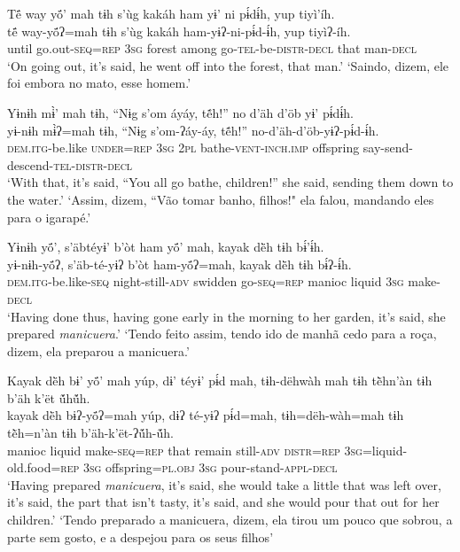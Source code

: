 \documentclass[output=paper,
modfonts,nonflat
]{langsci/langscibook}
\begin{document}
\ea  Të́ way yö́’ mah tɨh s’ùg kakáh ham yɨ’ ni pɨ́dɨ́h, yup tiyì’íh.\\ 
\gll të́ way-yö́ʔ=mah tɨh s’ùg kakáh ham-yɨʔ-ni-pɨ́d-ɨ́h, yup tiyìʔ-íh.\\
     until go.out\textsc{-seq=rep} \textsc{3sg} forest among go\textsc{-tel-}be\textsc{-distr-decl} that man\textsc{-decl}\\
\glt ‘On going out, it’s said, he went off into the forest, that man.'
\glt ‘Saindo, dizem, ele foi embora no mato, esse homem.'
\z 

\ea  Yɨnɨh mɨ̀’ mah tɨh, “Nɨg s’om áyáy, tẽ́h!” no d’äh d’öb yɨ’ pɨ́dɨ́h.\\ 
\gll yɨ-nɨh mɨ̀ʔ=mah tɨh, “Nɨg s’om-ʔáy-áy, tẽ́h!” no-d’äh-d’öb-yɨʔ-pɨ́d-ɨ́h.\\
     \textsc{dem.itg-}be.like \textsc{under=rep} \textsc{3sg} \textsc{2pl} bathe\textsc{-vent-inch.imp} offspring say-send-descend\textsc{-tel-distr-decl}\\
\glt ‘With that, it’s said, “You all go bathe, children!” she said, sending them down to the water.'
\glt ‘Assim, dizem, “Vão tomar banho, filhos!" ela falou, mandando eles para o igarapé.'
\z 

\ea  Yɨnɨh yö́’, s’äbtéyɨ’ b’òt ham yö́’ mah, kayak dë̀h tɨh bɨ́’ɨ́h.\\ 
\gll yɨ-nɨh-yö́ʔ, s’äb-té-yɨʔ b’òt ham-yö́ʔ=mah, kayak dë̀h tɨh bɨ́ʔ-ɨ́h.\\
     \textsc{dem.itg-}be.like\textsc{-seq} night-still\textsc{-adv} swidden go\textsc{-seq=rep} manioc liquid \textsc{3sg} make\textsc{-decl}\\
\glt ‘Having done thus, having gone early in the morning to her garden, it’s said, she prepared \textit{manicuera}.'
\glt ‘Tendo feito assim, tendo ido de manhã cedo para a roça, dizem, ela preparou a manicuera.'
\z 

\ea  Kayak dë̀h bɨ’ yö́’ mah yúp, dɨ’ téyɨ’ pɨ́d mah, tɨh-dëhwàh mah tɨh tẽ̀hn’àn tɨh b’äh k’ët ṹhṹh.\\ 
\gll kayak dë̀h bɨʔ-yö́ʔ=mah yúp, dɨʔ té-yɨʔ pɨ́d=mah, tɨh=dëh-wàh=mah tɨh tẽ̀h=n’àn tɨh b’äh-k’ët-ʔṹh-ṹh.\\
     manioc liquid make\textsc{-seq=rep} that remain still\textsc{-adv} \textsc{distr=rep} \textsc{3sg=}liquid-old.food\textsc{=rep} \textsc{3sg} offspring\textsc{=pl.obj} \textsc{3sg} pour-stand\textsc{-appl-decl}\\
\glt ‘Having prepared \textit{manicuera}, it’s said, she would take a little that was left over, it’s said, the part that isn’t tasty, it’s said, and she would pour that out for her children.'
\glt ‘Tendo preparado a manicuera, dizem, ela tirou um pouco que sobrou, a parte sem gosto, e a despejou para os seus filhos'
\z 
\end{document}
